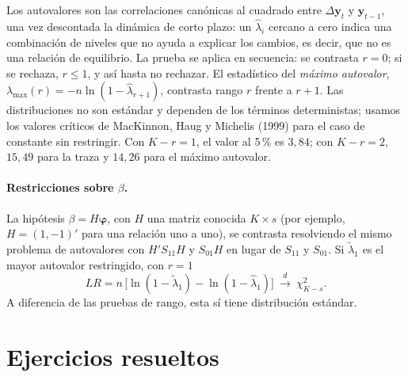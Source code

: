 Los autovalores son las correlaciones canónicas al cuadrado entre $\Delta\mathbf y_t$ y $\mathbf y_{t-1}$, una
vez descontada la dinámica de corto plazo: un $\hat\lambda_i$ cercano a cero indica una combinación de niveles que
no ayuda a explicar los cambios, es decir, que no es una relación de equilibrio. La prueba se aplica en
secuencia: se contrasta $r=0$; si se rechaza, $r\le1$, y así hasta no rechazar. El estadístico del \emph{máximo
autovalor}, $\lambda_{\max}(r)=-n\ln(1-\hat\lambda_{r+1})$, contrasta rango $r$ frente a $r+1$. Las distribuciones
no son estándar y dependen de los términos deterministas; usamos los valores críticos de MacKinnon, Haug y
Michelis (1999) para el caso de constante sin restringir. Con $K-r=1$, el valor al 5\,\% es $3{,}84$; con $K-r=2$,
$15{,}49$ para la traza y $14{,}26$ para el máximo autovalor.

\paragraph{Restricciones sobre $\beta$.} La hipótesis $\beta=H\boldsymbol\varphi$, con $H$ una matriz conocida
$K\times s$ (por ejemplo, $H=(1,-1)'$ para una relación uno a uno), se contrasta resolviendo el mismo problema de
autovalores con $H'S_{11}H$ y $S_{01}H$ en lugar de $S_{11}$ y $S_{01}$. Si $\tilde\lambda_1$ es el mayor autovalor
restringido, con $r=1$
\[
  LR=n\,\bigl[\ln(1-\tilde\lambda_1)-\ln(1-\hat\lambda_1)\bigr]\ \xrightarrow{d}\ \chi^2_{K-s}.
\]
A diferencia de las pruebas de rango, esta sí tiene distribución estándar.

\section{Ejercicios resueltos}

